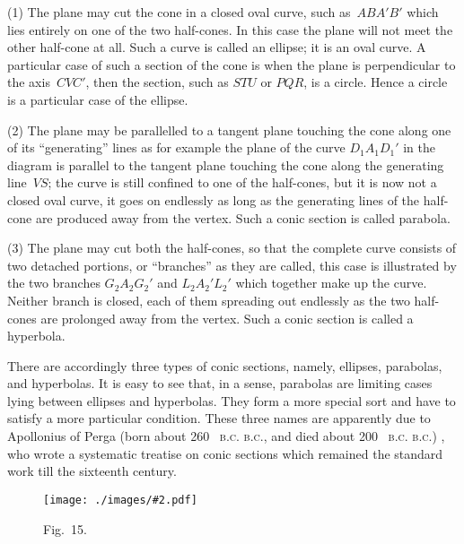 \documentclass[12pt,leqno]{book}[2005/09/16]
\makeatletter
\newcommand{\Graphic}[2]{%
  \phantomsection\label{fig:#2}%
  \texttt{[image: ./images/\#2.pdf]}%
}
\newcommand{\DefWidth}{4in}%
\newcommand{\Figure}[2][\DefWidth]{%
  \begin{figure}[hbt!]
    \centering
    \phantomsection\label{fig:#2}
    \Graphic{#1}{fig#2}
    \caption{Fig.~#2.}
  \end{figure}\ignorespaces%
}
\newcommand{\PageSep}[1]{\ignorespaces}
\newcommand{\SCAbbrev}[3]{%
  \ifthenelse{\equal{#3}{.}}%
  {\textsc{\MakeLowercase{#1.#2}.}}%
  {\textsc{\MakeLowercase{#1.#2}.}\@#3}%
}
\newcommand{\BC}[1]{\SCAbbrev{B}{C}{#1}}
\makeatother
\begin{document}
(1) The plane may cut the cone in a closed
%
oval curve, such as~$ABA'B'$ which lies entirely
on one of the two half-cones. In this
case the plane will not meet the other half-cone
at all. Such a curve is called an ellipse; it is
an oval curve. A particular case of such a
section of the cone is when the plane is perpendicular
to the axis~$CVC'$, then the section,
such as $STU$ or $PQR$, is a circle. Hence a
%
circle is a particular case of the ellipse.

(2) The plane may be parallelled to a tangent
plane touching the cone along one of its ``generating''
lines as for example the plane of the
\PageSep{131}
%
curve $D_{1}A_{1}D_{1}'$ in the diagram is parallel to
the tangent plane touching the cone along the
generating line~$VS$; the curve is still confined
to one of the half-cones, but it is now not a
closed oval curve, it goes on endlessly as long
as the generating lines of the half-cone are
produced away from the vertex. Such a
conic section is called parabola.

(3) The plane may cut both the half-cones,
%
so that the complete curve consists of two
detached portions, or ``branches'' as they
are called, this case is illustrated by the two
branches $G_{2}A_{2}G_{2}'$ and $L_{2}A_{2}'L_{2}'$ which together
make up the curve. Neither branch is closed,
each of them spreading out endlessly as the
two half-cones are prolonged away from the
vertex. Such a conic section is called a
hyperbola.

There are accordingly three types of conic
sections, namely, ellipses, parabolas, and
hyperbolas. It is easy to see that, in a sense,
parabolas are limiting cases lying between
ellipses and hyperbolas. They form a more
special sort and have to satisfy a more particular
condition. These three names are
apparently due to Apollonius of Perga (born
%
about 260~\BC, and died about 200~\BC), who
wrote a systematic treatise on conic sections
which remained the standard work till the
sixteenth century.
\Figure{15}
\end{document}

